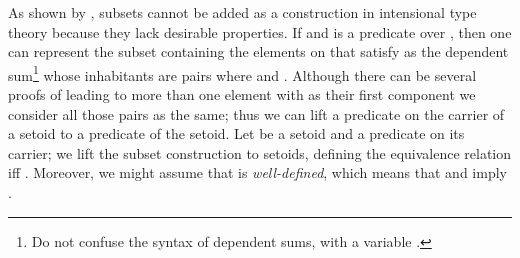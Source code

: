 \noindent As shown by \cite{salvesen-subsets},
subsets cannot be added as a construction in intensional type theory
because they lack desirable properties. If
\AgdaSpace{}\AgdaSymbol{:}\AgdaSpace{}
and
\AgdaSpace{}\AgdaSymbol{:}\AgdaSpace{}\AgdaSpace{}\AgdaSpace{}
is a predicate over , then one can represent the subset
containing the elements on  that satisfy  as
the dependent sum\footnote{Do not confuse the syntax
  \AgdaFunction{Σ[}\AgdaSymbol{\AgdaUnderscore{}}\AgdaSymbol{\AgdaUnderscore{}}\AgdaFunction{]}
  of dependent sums, with a variable
  \AgdaSpace{}\AgdaSymbol{:}\AgdaSpace{}.}
\AgdaFunction{Σ[}\AgdaSpace{}\AgdaSpace{}\AgdaSpace{}\AgdaSpace{}\AgdaFunction{]}\AgdaSpace{}
whose inhabitants are pairs
\AgdaSymbol{(}\AgdaSpace{}\AgdaInductiveConstructor{,}\AgdaSpace{}\AgdaSymbol{)}
where \AgdaSpace{}\AgdaSymbol{:}\AgdaSpace{}
and
\AgdaSpace{}\AgdaSymbol{:}\AgdaSpace{}\AgdaSpace{}. Although
there can be several proofs of \AgdaSpace{}
leading to more than one element with  as their first
component we consider all those pairs as the same; thus we can lift a
predicate on the carrier of a setoid to a predicate of the setoid. Let
 be a setoid and
\AgdaSpace{}\AgdaSymbol{:}\AgdaSpace{}\AgdaSpace{}%
\AgdaSpace{}\AgdaSpace{}\AgdaSpace{}
a predicate on its carrier; we lift the subset construction to
setoids, defining the equivalence relation
\AgdaSymbol{(}\AgdaSpace{}\AgdaInductiveConstructor{,}\AgdaSpace{}\AgdaSymbol{)}\AgdaSpace{}\AgdaSpace{}
\AgdaSymbol{(}\AgdaSpace{}\AgdaInductiveConstructor{,}\AgdaSpace{}\AgdaSymbol{)}
iff
\AgdaSpace{}\AgdaSpace{}.
Moreover, we might assume that  is \emph{well-defined},
which means that
\AgdaSpace{}\AgdaSpace{}
and \AgdaSpace{} imply
\AgdaSpace{}.

